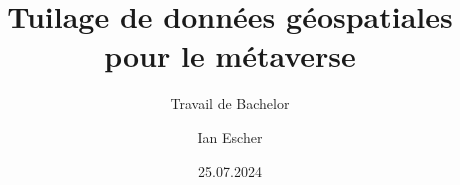 \author{Ian Escher}


\title{Tuilage de données géospatiales pour le métaverse}

\subtitle{Travail de Bachelor}


\date{25.07.2024}


